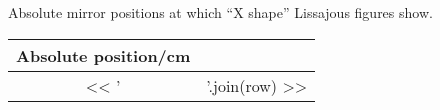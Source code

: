 \documentclass[11pt, english, fleqn, DIV=15, headinclude, BCOR=2cm]{scrreprt}
\begin{document}
\begin{appendix}
    Absolute mirror positions at which \enquote{X shape} Lissajous figures
    show.

    \begin{longtable}[l]{S}
        \toprule
        {Absolute position/\si{\centi\meter}} \\
        \midrule
        \endhead
        << ' & '.join(row) >> \\
        \bottomrule
    \end{longtable}

\end{appendix}
\end{document}
